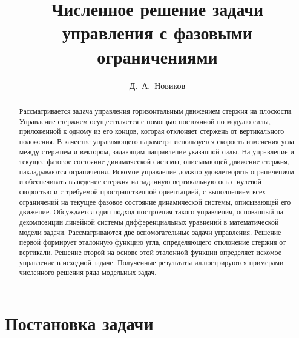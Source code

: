 \title{Численное решение задачи управления с фазовыми ограничениями}
\author{Д.~А.~Новиков%
} %

\maketitle

\begin{abstract}
Рассматривается задача управления горизонтальным движением стержня на плоскости. Управление стержнем осуществляется с помощью постоянной по модулю силы, приложенной к одному из его концов, которая отклоняет стержень от вертикального положения. В качестве управляющего параметра используется скорость изменения угла между стержнем и вектором, задающим направление указанной силы. На управление и текущее фазовое состояние динамической системы, описывающей движение стержня, накладываются ограничения. Искомое управление должно удовлетворять ограничениям и обеспечивать выведение стержня на заданную вертикальную ось с нулевой скоростью и с требуемой пространственной ориентацией, с выполнением всех ограничений на текущее фазовое состояние динамической системы, описывающей его движение. Обсуждается один подход построения такого управления, основанный на декомпозиции линейной системы дифференциальных уравнений в математической модели задачи. Рассматриваются две вспомогательные задачи управления. Решение первой формирует эталонную функцию угла, определяющего отклонение стержня от вертикали. Решение второй на основе этой эталонной функции определяет искомое управление в исходной задаче. Полученные результаты иллюстрируются примерами численного решения ряда модельных задач. 

\end{abstract}

\section{Постановка задачи} %


